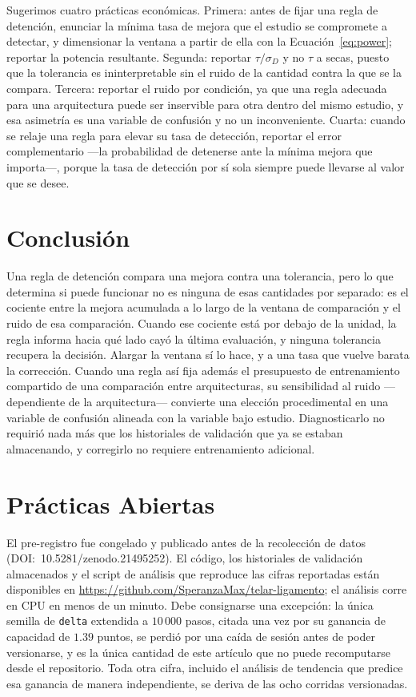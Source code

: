 \documentclass[jou,11pt,donotrepeattitle]{apa7}
\begin{document}
Sugerimos cuatro pr\'acticas econ\'omicas. Primera: antes de fijar una regla de detenci\'on,
enunciar la m\'inima tasa de mejora que el estudio se compromete a detectar, y dimensionar la
ventana a partir de ella con la Ecuaci\'on~\ref{eq:power}; reportar la potencia resultante.
Segunda: reportar $\tau/\sigma_D$ y no $\tau$ a secas, puesto que la tolerancia es ininterpretable
sin el ruido de la cantidad contra la que se la compara. Tercera: reportar el ruido por
condici\'on, ya que una regla adecuada para una arquitectura puede ser inservible para otra
dentro del mismo estudio, y esa asimetr\'ia es una variable de confusi\'on y no un inconveniente.
Cuarta: cuando se relaje una regla para elevar su tasa de detecci\'on, reportar el error
complementario ---la probabilidad de detenerse ante la m\'inima mejora que importa---, porque la
tasa de detecci\'on por s\'i sola siempre puede llevarse al valor que se desee.

\section{Conclusi\'on}

Una regla de detenci\'on compara una mejora contra una tolerancia, pero lo que determina si puede
funcionar no es ninguna de esas cantidades por separado: es el cociente entre la mejora acumulada
a lo largo de la ventana de comparaci\'on y el ruido de esa comparaci\'on. Cuando ese cociente
est\'a por debajo de la unidad, la regla informa hacia qu\'e lado cay\'o la \'ultima evaluaci\'on,
y ninguna tolerancia recupera la decisi\'on. Alargar la ventana s\'i lo hace, y a una tasa que
vuelve barata la correcci\'on. Cuando una regla as\'i fija adem\'as el presupuesto de
entrenamiento compartido de una comparaci\'on entre arquitecturas, su sensibilidad al ruido
---dependiente de la arquitectura--- convierte una elecci\'on procedimental en una variable de
confusi\'on alineada con la variable bajo estudio. Diagnosticarlo no requiri\'o nada m\'as que los
historiales de validaci\'on que ya se estaban almacenando, y corregirlo no requiere entrenamiento
adicional.

\section*{Pr\'acticas Abiertas}

El pre-registro fue congelado y publicado antes de la recolecci\'on de datos
(DOI:~10.5281/zenodo.21495252). El c\'odigo, los historiales de validaci\'on almacenados y el
script de an\'alisis que reproduce las cifras reportadas est\'an disponibles en
\url{https://github.com/SperanzaMax/telar-ligamento}; el an\'alisis corre en CPU en menos de un
minuto. Debe consignarse una excepci\'on: la \'unica semilla de \texttt{delta} extendida a
$10\,000$ pasos, citada una vez por su ganancia de capacidad de $1.39$ puntos, se perdi\'o por
una ca\'ida de sesi\'on antes de poder versionarse, y es la \'unica cantidad de este art\'iculo
que no puede recomputarse desde el repositorio. Toda otra cifra, incluido el an\'alisis de
tendencia que predice esa ganancia de manera independiente, se deriva de las ocho corridas
versionadas.

\printbibliography
\end{document}
